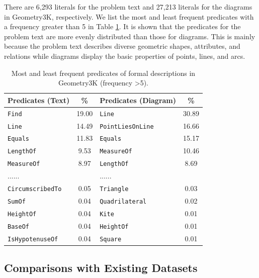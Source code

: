 \documentclass[11pt,a4paper]{article}
\begin{document}
There are 6,293 literals for the problem text and 27,213 literals for the diagrams in Geometry3K, respectively. We list the most and least frequent predicates with a frequency greater than 5 in Table \ref{table:literal}. It is shown that the predicates for the problem text are more evenly distributed than those for diagrams. This is mainly because the problem text describes diverse geometric shapes, attributes, and relations while diagrams display the basic properties of points, lines, and arcs.


\begin{table}[t!]
\centering 
\setlength{\tabcolsep}{1.5pt}
\footnotesize
\begin{tabular}{lc|lc}
	\hline
	 Predicates (Text) & \% & Predicates (Diagram) & \% \\
	\hline
    \texttt{Find} & 19.00 & \texttt{Line} & 30.89 \\
    \texttt{Line} & 14.49 & \texttt{PointLiesOnLine} & 16.66 \\
    \texttt{Equals} & 11.83 & \texttt{Equals} & 15.17 \\
    \texttt{LengthOf} & 9.53  & \texttt{MeasureOf} & 10.46 \\
    \texttt{MeasureOf} & 8.97 & \texttt{LengthOf} & 8.69  \\
    ...... &  & ...... & \\
    \texttt{CircumscribedTo} & 0.05 & \texttt{Triangle} & 0.03 \\
    \texttt{SumOf} & 0.04 & \texttt{Quadrilateral} & 0.02 \\
    \texttt{HeightOf} & 0.04 & \texttt{Kite} & 0.01 \\
    \texttt{BaseOf} & 0.04 & \texttt{HeightOf} & 0.01 \\
    \texttt{IsHypotenuseOf} & 0.04 & \texttt{Square} & 0.01 \\
	\hline
\end{tabular}
\caption{Most and least frequent predicates of formal descriptions in Geometry3K (frequency \textgreater 5).}
\label{table:literal}
\end{table}

\subsection{Comparisons with Existing Datasets}
\end{document}
